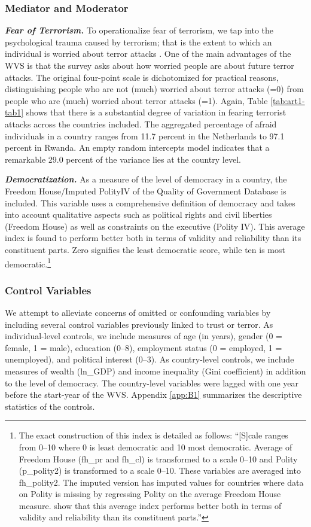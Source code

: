 \subsubsection{Mediator and Moderator}
\noindent\textbf{\textit{Fear of Terrorism.}} To operationalize fear of terrorism, we tap into the psychological trauma caused by terrorism; that is the extent to which an individual is worried about terror attacks \citep{Sinclair2012}. One of the main advantages of the WVS is that the survey asks about how worried people are about future terror attacks. The original four-point scale is dichotomized for practical reasons, distinguishing people who are not (much) worried about terror attacks (=0) from people who are (much) worried about terror attacks (=1). Again, Table \ref{tab:art1-tab1} shows that there is a substantial degree of variation in fearing terrorist attacks across the countries included. The aggregated percentage of afraid individuals in a country ranges from 11.7 percent in the Netherlands to 97.1 percent in Rwanda. An empty random intercepts model indicates that a remarkable 29.0 percent of the variance lies at the country level.

\vspace{3mm}
\noindent\textbf{\textit{Democratization.}} As a measure of the level of democracy in a country, the Freedom House/Imputed PolityIV of the Quality of Government Database is included. This variable uses a comprehensive definition of democracy and takes into account qualitative aspects such as political rights and civil liberties (Freedom House) as well as constraints on the executive (Polity IV). This average index is found to perform better both in terms of validity and reliability than its constituent parts. Zero signifies the least democratic score, while ten is most democratic.\footnote{The exact construction of this index is detailed as follows: ``[S]cale ranges from 0–10 where 0 is least democratic and 10 most democratic. Average of Freedom House (fh\_pr and fh\_cl) is transformed to a scale 0–10 and Polity (p\_polity2) is transformed to a scale 0–10. These variables are averaged into fh\_polity2. The imputed version has imputed values for countries where data on Polity is missing by regressing Polity on the average Freedom House measure. \cite{Hadenius2005} show that this average index performs better both in terms of validity and reliability than its constituent parts.''}


\subsubsection{Control Variables}
We attempt to alleviate concerns of omitted or confounding variables by including several control variables previously linked to trust or terror. As individual-level controls, we include measures of age (in years), gender (0 = female, 1 = male), education (0–8), employment status (0 = employed, 1 = unemployed), and political interest (0–3). As country-level controls, we include measures of wealth (ln\_GDP) and income inequality (Gini coefficient) in addition to the level of democracy. The country-level variables were lagged with one year before the start-year of the WVS. Appendix \ref{app:B1} summarizes the descriptive statistics of the controls. 


